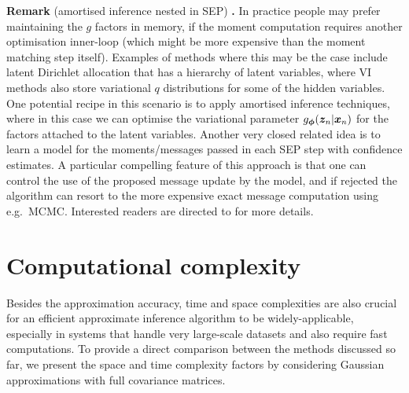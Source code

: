\vspace{1em}
\begin{tcolorbox}
\textbf{Remark} (amortised inference nested in SEP) \textbf{.}
In practice people may prefer maintaining the $g$ factors in memory, if the moment computation requires another optimisation inner-loop (which might be more expensive than the moment matching step itself). Examples of methods where this may be the case include latent Dirichlet allocation \citep{blei:lda2003} that has a hierarchy of latent variables, where VI methods also store variational $q$ distributions for some of the hidden variables. One potential recipe in this scenario is to apply amortised inference techniques, where in this case we can optimise the variational parameter $g_{\bm{\phi}}(\bm{z}_n | \bm{x}_n )$ for the factors attached to the latent variables. 
%
Another very closed related idea is to learn a model for the moments/messages passed in each SEP step with confidence estimates. A particular compelling feature of this approach is that one can control the use of the proposed message update by the model, and if rejected the algorithm can resort to the more expensive exact message computation using e.g.~MCMC. Interested readers are directed to \citep{heess:learning_messages2013, jitkrittum:kernel2015} for more details. 
\end{tcolorbox}

\section{Computational complexity}
\label{sec:chap3_complexity}
Besides the approximation accuracy, time and space complexities are also crucial for an efficient approximate inference algorithm to be widely-applicable, especially in systems that handle very large-scale datasets and also require fast computations. To provide a direct comparison between the methods discussed so far, we present the space and time complexity factors by considering Gaussian approximations with full covariance matrices. 

